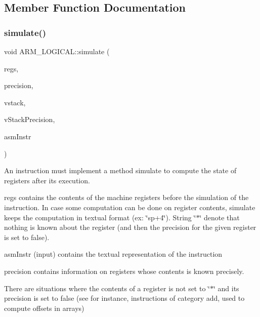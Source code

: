 \subsection{Member Function Documentation}
\mbox{\label{classARM__LOGICAL_a6359a7daad8f3ddbe314a378e030bf1b}} 
\subsubsection{\texorpdfstring{simulate()}{simulate()}}
{\footnotesize\ttfamily void A\+R\+M\+\_\+\+L\+O\+G\+I\+C\+A\+L\+::simulate (\begin{DoxyParamCaption}\item[{\hyperlink{DAAInstruction_8h_af0fae93a861de9cf37988d5673cac523}{reg\+Table} \&}]{regs,  }\item[{\hyperlink{DAAInstruction_8h_a0e8cae02815a5f8adc750122d790b455}{reg\+Precision\+Table} \&}]{precision,  }\item[{\hyperlink{DAAInstruction_8h_a1b0e70ac1a04f06c8132055ed01f589f}{stack\+Type} \&}]{vstack,  }\item[{\hyperlink{DAAInstruction_8h_ac5cb793e9dac3fa9693da78b7e29ab30}{stack\+Prec\+Type} \&}]{v\+Stack\+Precision,  }\item[{const string \&}]{asm\+Instr }\end{DoxyParamCaption})\hspace{0.3cm}{\ttfamily [virtual]}}

An instruction must implement a method simulate to compute the state of registers after its execution.

regs contains the contents of the machine registers before the simulation of the instruction. In case some computation can be done on register contents, simulate keeps the computation in textual format (ex\+: \char`\"{}sp+4\char`\"{}). String \char`\"{}$\ast$\char`\"{} denote that nothing is known about the register (and then the precision for the given register is set to false).

asm\+Instr (input) contains the textual representation of the instruction

precision contains information on registers whose contents is known precisely.

There are situations where the contents of a register is not set to \char`\"{}$\ast$\char`\"{} and its precision is set to false (see for instance, instructions of category add, used to compute offsets in arrays)

